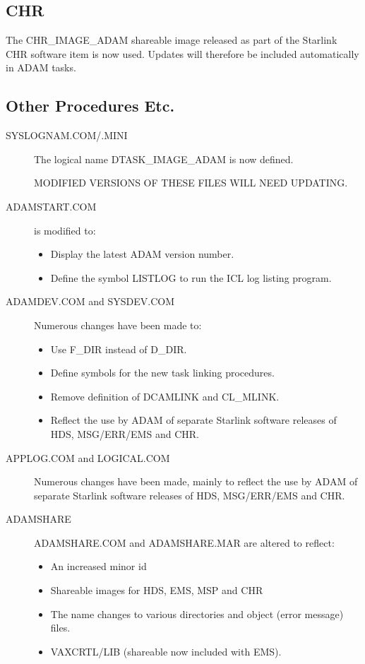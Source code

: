 \subsection{CHR}
\label{chr}
The CHR\_IMAGE\_ADAM shareable image released as part of the Starlink CHR
software item is now used. Updates will therefore be included automatically
in ADAM tasks.

\subsection{Other Procedures Etc.}
\begin{description}

\item[SYSLOGNAM.COM/.MINI]
The logical name DTASK\_IMAGE\_ADAM is now defined.

MODIFIED VERSIONS OF THESE FILES WILL NEED UPDATING.

\item[ADAMSTART.COM] is modified to:
\begin{itemize}
\item Display the latest ADAM version number.
\item Define the symbol LISTLOG to run the ICL log listing program.
\end{itemize}

\item[ADAMDEV.COM and SYSDEV.COM] Numerous changes have been made to:
\begin{itemize}
\item Use F\_DIR instead of D\_DIR.
\item Define symbols for the new task linking procedures.
\item Remove definition of DCAMLINK and CL\_MLINK.
\item Reflect the use by ADAM of separate Starlink software releases of HDS,
MSG/ERR/EMS and CHR.
\end{itemize}

\item[APPLOG.COM and LOGICAL.COM] Numerous changes have been made, mainly to 
reflect the use by ADAM of separate Starlink software releases of HDS, 
MSG/ERR/EMS and CHR.

\item[ADAMSHARE]
ADAMSHARE.COM and ADAMSHARE.MAR are altered to reflect:
\begin{itemize}
\item An increased minor id
\item Shareable images for HDS, EMS, MSP and CHR
\item The name changes to various directories and object (error message)
files.
\item VAXCRTL/LIB (shareable now included with EMS).
\end{itemize}


\end{description}
